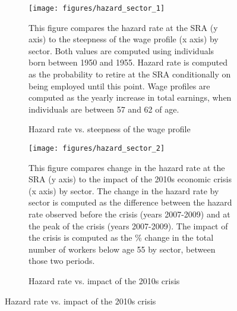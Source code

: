 \documentclass[12pt,a4paper]{article}
\begin{document}
\vspace{.2cm}
\begin{figure}[H]
	\caption{Hazard rate at the SRA by sector's characteristics}
	\label{appendix_figure_hazard}
	\centering
	\begin{subfigure}{1\textwidth}
		\centering
		\caption{Hazard rate vs. steepness of the wage profile}
		\texttt{[image: figures/hazard\_sector\_1]} %
		\label{appendix_figure_hazard1}
  \begin{minipage}{0.9\textwidth}
  \footnotesize
  This figure compares the hazard rate at the SRA (y axis) to the steepness of the wage profile (x axis) by sector. Both values are computed using individuals born between 1950 and 1955. Hazard rate is computed as the probability to retire at the SRA conditionally on being employed until this point. Wage profiles are computed as the yearly increase in total earnings, when individuals are between 57 and 62 of age. 
\vspace*{0.3cm}
  \end{minipage}
	\end{subfigure}
	\begin{subfigure}{1\textwidth}
		\centering
		\caption{Hazard rate vs. impact of the 2010s crisis}
		\texttt{[image: figures/hazard\_sector\_2]} 	
		\label{appendix_figure_hazard2}
    \begin{minipage}{0.9\textwidth}
  \footnotesize
  This figure compares change in the hazard rate at the SRA (y axis) to the impact of the 2010s economic crisis (x axis) by sector. The change in the hazard rate by sector is computed as the difference between the hazard rate observed before the crisis (years 2007-2009) and at the peak of the crisis (years 2007-2009). The impact of the crisis is computed as the \% change in the total number of workers below age 55 by sector, between those two periods. 
\vspace*{0.3cm}
  \end{minipage}
	\end{subfigure}
\end{figure}
\end{document}
